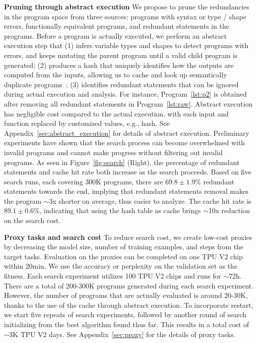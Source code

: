 \documentclass{article}
\begin{document}
\textbf{Pruning through abstract execution} 
We propose to prune the redundancies in the program space from three sources: programs with syntax or type / shape errors, functionally equivalent programs, and redundant statements in the programs. Before a program is actually executed, we perform an abstract execution step that (1) infers variable types and shapes to detect programs with errors, and keeps mutating the parent program until a valid child program is generated; (2) produces a hash that uniquely identifies how the outputs are computed from the inputs, allowing us to cache and look up semantically duplicate programs~\citep{ryan2023hash}; (3) identifies redundant statements that can be ignored during actual execution and analysis. For instance, Program~\ref{lst:p2} is obtained after removing all redundant statements in Program~\ref{lst:raw}. Abstract execution has negligible cost compared to the actual execution, with each input and function replaced by customized values, e.g., hash.
See Appendix~\ref{sec:abstract_execution} for details of abstract execution. 
Preliminary experiments have shown that the search process can become overwhelmed with invalid programs and cannot make progress without filtering out invalid programs.
As seen in Figure~\ref{fig:search} (Right), the percentage of redundant statements and cache hit rate both increase as the search proceeds. 
Based on five search runs, each covering 300K programs, there are $69.8\pm1.9\%$ redundant statements towards the end, implying that redundant statements removal makes the program $\sim$3x shorter on average, thus easier to analyze. The cache hit rate is $89.1\pm0.6\%$, indicating that using the hash table as cache brings $\sim$10x reduction on the search cost.


\textbf{Proxy tasks and search cost} 
To reduce search cost, we create low-cost proxies by decreasing the model size, number of training examples, and steps from the target tasks. Evaluation on the proxies can be completed on one TPU V2 chip within 20min. We use the accuracy or perplexity on the validation set as the fitness. Each search experiment utilizes 100 TPU V2 chips and runs for $\sim$72h. There are a total of 200-300K programs generated during each search experiment. However, the number of programs that are actually evaluated is around 20-30K, thanks to the use of the cache through abstract execution. To incorporate restart, we start five repeats of search experiments, followed by another round of search initializing from the best algorithm found thus far. This results in a total cost of $\sim$3K TPU V2 days. See Appendix~\ref{sec:proxy} for the details of proxy tasks. 
\end{document}
